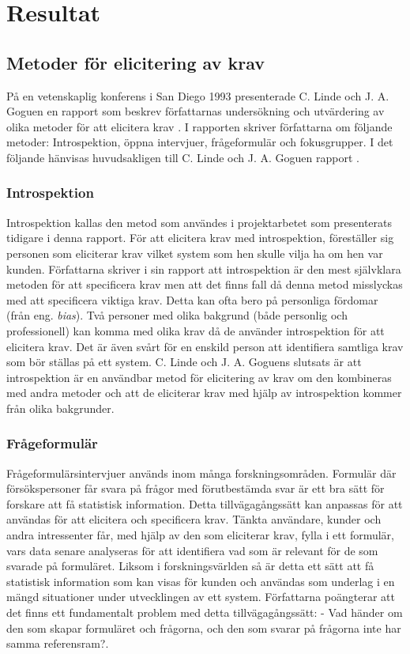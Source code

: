 \section{Resultat}
\label{sec:results-jannering}
\subsection{Metoder för elicitering av krav}
På en vetenskaplig konferens i San Diego 1993 presenterade C. Linde och J. A. Goguen en rapport som beskrev författarnas undersökning och utvärdering av olika metoder för att elicitera krav \cite{goguen1993techniques}. I rapporten skriver författarna om följande metoder: Introspektion, öppna intervjuer, frågeformulär och fokusgrupper. I det följande hänvisas huvudsakligen till C. Linde och J. A. Goguen rapport \cite{goguen1993techniques}. 

\subsubsection{Introspektion}
Introspektion kallas den metod som användes i projektarbetet som presenterats tidigare i denna rapport. För att elicitera krav med introspektion, föreställer sig personen som eliciterar krav vilket system som hen skulle vilja ha om hen var kunden. Författarna skriver i sin rapport att introspektion är den mest självklara metoden för att specificera krav men att det finns fall då denna metod misslyckas med att specificera viktiga krav. Detta kan ofta bero på personliga fördomar (från eng. \textit{bias}). Två personer med olika bakgrund (både personlig och professionell) kan komma med olika krav då de använder introspektion för att elicitera krav. Det är även svårt för en enskild person att identifiera samtliga krav som bör ställas på ett system.  C. Linde och J. A. Goguens slutsats är att introspektion är en användbar metod för elicitering av krav om den kombineras med andra metoder och att de eliciterar krav med hjälp av introspektion kommer från olika bakgrunder. 

\subsubsection{Frågeformulär}
Frågeformulärsintervjuer används inom många forskningsområden. Formulär där försökspersoner får svara på frågor med förutbestämda svar är ett bra sätt för forskare att få statistisk information. Detta tillvägagångssätt kan anpassas för att användas för att elicitera och specificera krav. Tänkta användare, kunder och andra intressenter får, med hjälp av den som eliciterar krav, fylla i ett formulär, vars data senare analyseras för att identifiera vad som är relevant för de som svarade på formuläret. Liksom i forskningsvärlden så är detta ett sätt att få statistisk information som kan visas för kunden och användas som underlag i en mängd situationer under utvecklingen av ett system. Författarna poängterar att det finns ett fundamentalt problem med detta tillvägagångssätt: - Vad händer om den som skapar formuläret och frågorna, och den som svarar på frågorna inte har samma referensram?.
 
